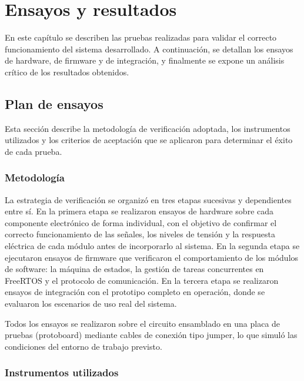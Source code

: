 \chapter{Ensayos y resultados}

En este capítulo se describen las pruebas realizadas para validar el correcto
funcionamiento del sistema desarrollado. A continuación, se detallan los ensayos de hardware, de firmware y de integración,
y finalmente se expone un análisis crítico de los resultados obtenidos.

\section{Plan de ensayos}
\label{sec:plan_ensayos}
Esta sección describe la metodología de verificación adoptada, los instrumentos
utilizados y los criterios de aceptación que se aplicaron para determinar el éxito
de cada prueba.

\subsection{Metodología}

La estrategia de verificación se organizó en tres etapas sucesivas y dependientes
entre sí. En la primera etapa se realizaron ensayos de hardware sobre cada
componente electrónico de forma individual, con el objetivo de confirmar el
correcto funcionamiento de las señales, los niveles de tensión y la respuesta
eléctrica de cada módulo antes de incorporarlo al sistema. En la segunda etapa
se ejecutaron ensayos de firmware que verificaron el comportamiento de los
módulos de software: la máquina de estados, la gestión de tareas concurrentes
en FreeRTOS y el protocolo de comunicación. En la tercera etapa se realizaron
ensayos de integración con el prototipo completo en operación, donde se
evaluaron los escenarios de uso real del sistema.

Todos los ensayos se realizaron sobre el circuito ensamblado en una placa de
pruebas (protoboard) mediante cables de conexión tipo jumper,
lo que simuló las condiciones del entorno de trabajo previsto.

\subsection{Instrumentos utilizados}

